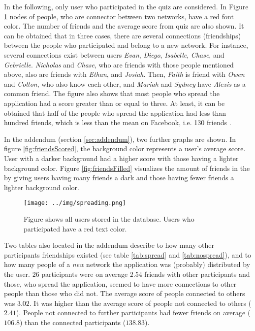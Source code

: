 \documentclass[preprint,12pt]{elsarticle}
\begin{document}
In the following, only user who participated in the quiz are
considered. In Figure \ref{fig:spreading} nodes of people, who are
connector between two networks, have a red font color. The number of
friends and the average score from quiz are also shown. 
It can be obtained that in three cases, there are several connections (friendships)
between the people who participated and belong to a new network. For
instance, several connections exist between users \textit{Evan},
\textit{Diego}, \textit{Isabelle}, \textit{Chase}, and \textit{Gebrielle}.
\textit{Nicholas} and \textit{Chase}, who are friends with those
people mentioned above, also are friends with \textit{Ethan},
and \textit{Josiah}.  Then, \textit{Faith} is friend with
\textit{Owen} and \textit{Colton}, who also know each other, and
\textit{Mariah} and \textit{Sydney} have \textit{Alexis} as a common
friend. The figure also shows that most people who spread the
application had a score greater than or equal to three. At least, it
can be obtained that half of the people who spread the application
had less than hundred friends, which is less than the mean on
Facebook, i.e. 130 friends \cite{ref:facebookStats}.

In the addendum (section \ref{sec:addendum}), two further graphs are
shown. In figure \ref{fig:friendsScored}, the background color
represents a user's average score. User with a darker background had a
higher score with those having a lighter background color. 
Figure \ref{fig:friendsFilled} visualizes the amount of friends in the
by giving users having many friends a dark and those having fewer
friends a lighter background color. 


\begin{figure}
  \texttt{[image: ../img/spreading.png]}
\caption{Figure shows all users stored in the database. Users who
  participated have a red text color.}
\label{fig:spreading}
\end{figure}

Two tables also located in the addendum describe to how many
other participants friendships existed (see table \ref{tab:spread} and
\ref{tab:nospread}), and to how many people of a
\textit{new} network the application was (probably) distributed by the
user. $26$ participants were on average $2.54$ friends with other
participants and those, who spread the application, seemed to have
more connections to other people than those who did not.
The average score of people connected to others was $3.02$. It was
higher than the average score of people not connected to others ($2.41$).
People not connected to further participants had fewer friends on average ($106.8$)
than the connected participants ($138.83$).
\end{document}
